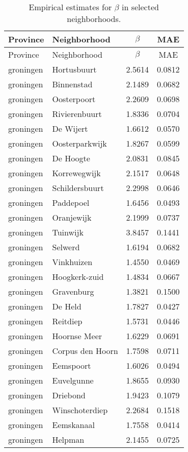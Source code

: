 \begin{longtable}{llcc}
\caption{Empirical estimates for $\beta$ in selected neighborhoods.} \label{tab:results}\\
\hline
Province & Neighborhood & $\beta$ & MAE \\
\hline
\endfirsthead
\hline
Province & Neighborhood & $\beta$ & MAE \\
\hline
\endhead
groningen & Hortusbuurt & 2.5614 & 0.0812 \\
groningen & Binnenstad & 2.1489 & 0.0682 \\
groningen & Oosterpoort & 2.2609 & 0.0698 \\
groningen & Rivierenbuurt & 1.8336 & 0.0704 \\
groningen & De Wijert & 1.6612 & 0.0570 \\
groningen & Oosterparkwijk & 1.8267 & 0.0599 \\
groningen & De Hoogte & 2.0831 & 0.0845 \\
groningen & Korrewegwijk & 2.1517 & 0.0648 \\
groningen & Schildersbuurt & 2.2998 & 0.0646 \\
groningen & Paddepoel & 1.6456 & 0.0493 \\
groningen & Oranjewijk & 2.1999 & 0.0737 \\
groningen & Tuinwijk & 3.8457 & 0.1441 \\
groningen & Selwerd & 1.6194 & 0.0682 \\
groningen & Vinkhuizen & 1.4550 & 0.0469 \\
groningen & Hoogkerk-zuid & 1.4834 & 0.0667 \\
groningen & Gravenburg & 1.3821 & 0.1500 \\
groningen & De Held & 1.7827 & 0.0427 \\
groningen & Reitdiep & 1.5731 & 0.0446 \\
groningen & Hoornse Meer & 1.6229 & 0.0691 \\
groningen & Corpus den Hoorn & 1.7598 & 0.0711 \\
groningen & Eemspoort & 1.6026 & 0.0494 \\
groningen & Euvelgunne & 1.8655 & 0.0930 \\
groningen & Driebond & 1.9423 & 0.1079 \\
groningen & Winschoterdiep & 2.2684 & 0.1518 \\
groningen & Eemskanaal & 1.7558 & 0.0414 \\
groningen & Helpman & 2.1455 & 0.0725 \\

\end{longtable}
